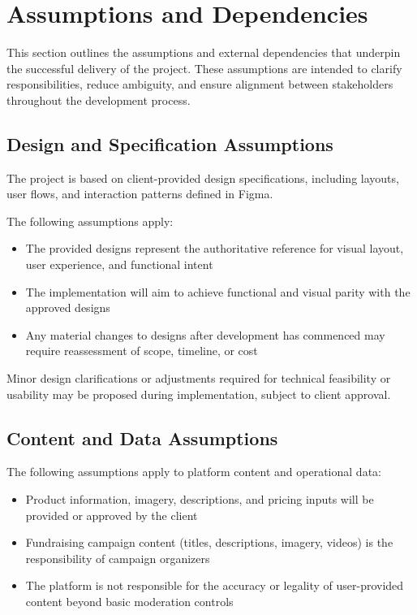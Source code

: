 \section{Assumptions and Dependencies}

This section outlines the assumptions and external dependencies that underpin the
successful delivery of the project. These assumptions are intended to clarify
responsibilities, reduce ambiguity, and ensure alignment between stakeholders
throughout the development process.

\subsection{Design and Specification Assumptions}

The project is based on client-provided design specifications, including layouts,
user flows, and interaction patterns defined in Figma.

The following assumptions apply:
\begin{itemize}[leftmargin=1.5em]
    \item The provided designs represent the authoritative reference for visual
    layout, user experience, and functional intent
    \item The implementation will aim to achieve functional and visual parity
    with the approved designs
    \item Any material changes to designs after development has commenced may
    require reassessment of scope, timeline, or cost
\end{itemize}

Minor design clarifications or adjustments required for technical feasibility or
usability may be proposed during implementation, subject to client approval.

\subsection{Content and Data Assumptions}

The following assumptions apply to platform content and operational data:
\begin{itemize}[leftmargin=1.5em]
    \item Product information, imagery, descriptions, and pricing inputs will be
    provided or approved by the client
    \item Fundraising campaign content (titles, descriptions, imagery, videos)
    is the responsibility of campaign organizers
    \item The platform is not responsible for the accuracy or legality of
    user-provided content beyond basic moderation controls
\end{itemize}

